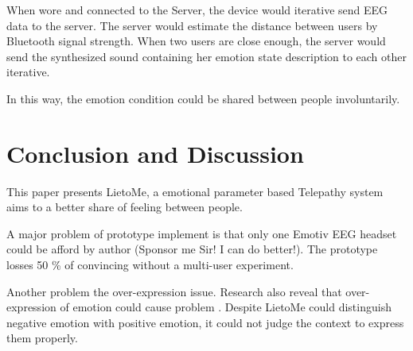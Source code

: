 \documentclass[a4paper]{article}
\begin{document}
When wore and connected to the Server, the device would iterative send EEG data to the server. The server would estimate the distance between users by Bluetooth signal strength. When two users are close enough, the server would send the synthesized sound containing her emotion state description to each other iterative.

In this way, the emotion condition could be shared between people involuntarily.

\section{Conclusion and Discussion}

This paper presents LietoMe, a emotional parameter based Telepathy system aims to a better share of feeling between people. 

A major problem of prototype implement is that only one Emotiv EEG headset could be afford by author (Sponsor me Sir! I can do better!). The prototype losses 50 \% of convincing without a multi-user experiment.

Another problem the over-expression issue. Research also reveal that over-expression of emotion could cause problem \autocite{bonanno2004importance}. Despite LietoMe could distinguish negative emotion with positive emotion, it could not judge the context to express them properly.


\printbibliography
\end{document}
